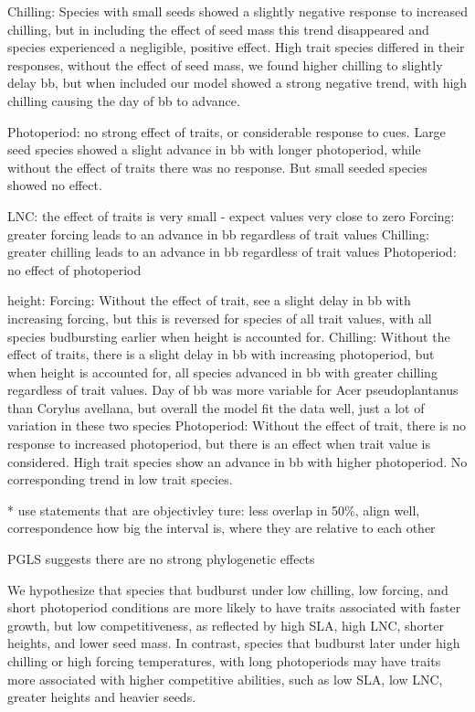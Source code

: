 \documentclass{article}\usepackage[]{graphicx}\usepackage[]{color}
\begin{document}
Chilling: Species with small seeds showed a slightly negative response to increased chilling, but in including the effect of seed mass this trend disappeared and species experienced a negligible, positive effect. High trait species differed in their responses, without the effect of seed mass, we found higher chilling to slightly delay bb, but when included our model showed a strong negative trend, with high chilling causing the day of bb to advance. 

Photoperiod: no strong effect of traits, or considerable response to cues. Large seed species showed a slight advance in bb with longer photoperiod, while without the effect of traits there was no response. But small seeded species showed no effect.

LNC: the effect of traits is very small - expect values very close to zero
Forcing: greater forcing leads to an advance in bb regardless of trait values
Chilling: greater chilling leads to an advance in bb regardless of trait values
Photoperiod: no effect of photoperiod 

height:
Forcing: Without the effect of trait, see a slight delay in bb with increasing forcing, but this is reversed for species of all trait values, with all species budbursting earlier when height is accounted for.
Chilling: Without the effect of traits, there is a slight delay in bb with increasing photoperiod, but when height is accounted for, all species advanced in bb with greater chilling regardless of trait values. Day of bb was more variable for Acer pseudoplantanus than Corylus avellana, but overall the model fit the data well, just a lot of variation in these two species
Photoperiod: Without the effect of trait, there is no response to increased photoperiod, but there is an effect when trait value is considered. High trait species show an advance in bb with higher photoperiod. No corresponding trend in low trait species.


* use statements that are objectivley ture: less overlap in 50\%, align well, correspondence 
how big the interval is, where they are relative to each other

PGLS suggests there are no strong phylogenetic effects

 We hypothesize that species that budburst under low chilling, low forcing, and short photoperiod conditions are more likely to have traits associated with faster growth, but low competitiveness, as reflected by high SLA, high LNC, shorter heights, and lower seed mass. In contrast, species that budburst later under high chilling or high forcing temperatures, with long photoperiods  may have traits more associated with higher competitive abilities, such as low SLA, low LNC, greater heights and heavier seeds. 
\end{document}
